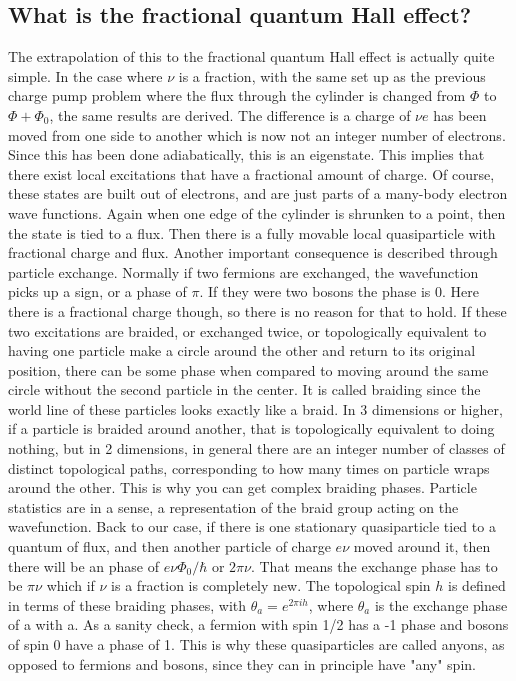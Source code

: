 \subsection{What is the fractional quantum Hall effect?}

The extrapolation of this to the fractional quantum Hall effect is actually quite simple. In the case where $\nu$ is a fraction, with the same set up as the previous charge pump problem where the flux through the cylinder is changed from $\Phi$ to $\Phi + \Phi_0$, the same results are derived. The difference is a charge of $\nu e$ has been moved from one side to another which is now not an integer number of electrons. Since this has been done adiabatically, this is an eigenstate. This implies that there exist local excitations that have a fractional amount of charge. Of course, these states are built out of electrons, and are just parts of a many-body electron wave functions. Again when one edge of the cylinder is shrunken to a point, then the state is tied to a flux. Then there is a fully movable local quasiparticle with fractional charge and flux. Another important consequence is described through particle exchange. Normally if two fermions are exchanged, the wavefunction picks up a sign, or a phase of $\pi$. If they were two bosons the phase is 0. Here there is a fractional charge though, so there is no reason for that to hold. If these two excitations are braided, or exchanged twice, or topologically equivalent to having one particle make a circle around the other and return to its original position, there can be some phase when compared to moving around the same circle without the second particle in the center. It is called braiding since the world line of these particles looks exactly like a braid. In 3 dimensions or higher, if a particle is braided around another, that is topologically equivalent to doing nothing, but in 2 dimensions, in general there are an integer number of classes of distinct topological paths, corresponding to how many times on particle wraps around the other. This is why you can get complex braiding phases. Particle statistics are in a sense, a representation of the braid group acting on the wavefunction. Back to our case, if there is one stationary quasiparticle tied to a quantum of flux, and then another particle of charge $e\nu$ moved around it, then there will be an phase of $e\nu\Phi_0/\hbar$ or $2\pi\nu$. That means the exchange phase has to be $\pi \nu$ which if $\nu$ is a fraction is completely new. The topological spin $h$ is defined in terms of these braiding phases, with $\theta_{a}=e^{2\pi i h}$, where $\theta_{a}$ is the exchange phase of a with a. As a sanity check, a fermion with spin 1/2 has a -1 phase and bosons of spin 0 have a phase of 1. This is why these quasiparticles are called anyons, as opposed to fermions and bosons, since they can in principle have "any" spin. 

